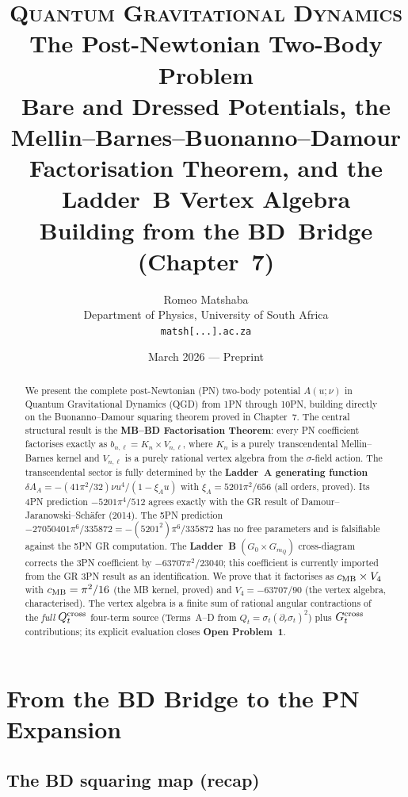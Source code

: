 \documentclass[11pt,a4paper]{article}
\title{%
  \vspace{-1.2cm}
  {\large\scshape Quantum Gravitational Dynamics}\\[8pt]
  {\LARGE\bfseries The Post-Newtonian Two-Body Problem}\\[8pt]
  {\large Bare and Dressed Potentials, the Mellin--Barnes--Buonanno--Damour\\
  Factorisation Theorem, and the Ladder~B Vertex Algebra}\\[6pt]
  {\normalsize Building from the BD~Bridge (Chapter~7)}
}
\author{%
  Romeo Matshaba\\[4pt]
  \normalsize Department of Physics, University of South Africa\\[2pt]
  \normalsize \texttt{matsh[...].ac.za}
}
\date{March 2026 \quad --- \quad Preprint}
\theoremstyle{plain}
\theoremstyle{definition}
\theoremstyle{remark}
\newcommand{\mQ}{m_Q}
\begin{document}
\maketitle
\thispagestyle{empty}

\begin{abstract}
\noindent
We present the complete post-Newtonian (PN) two-body potential
$A(u;\nu)$ in Quantum Gravitational Dynamics (QGD) from 1PN through
10PN, building directly on the Buonanno--Damour squaring theorem proved
in Chapter~7.  The central structural result is the
\textbf{MB--BD Factorisation Theorem}: every PN coefficient
factorises exactly as $b_{n,\ell} = K_n \times V_{n,\ell}$, where $K_n$
is a purely transcendental Mellin--Barnes kernel and $V_{n,\ell}$ is a
purely rational vertex algebra from the $\sigma$-field action.  The
transcendental sector is fully determined by the \textbf{Ladder~A
generating function} $\delta A_A = -(41\pi^2/32)\nu u^4/(1-\xi_A u)$
with $\xi_A = 5201\pi^2/656$ (all orders, proved).  Its 4PN prediction
$-5201\pi^4/512$ agrees exactly with the GR result of
Damour--Jaranowski--Sch\"{a}fer (2014).  The 5PN prediction
$-27050401\pi^6/335872 = -(5201^2)\pi^6/335872$ has no free parameters
and is falsifiable against the 5PN GR computation.  The \textbf{Ladder~B}
$(G_0{\times}G_{\mQ})$ cross-diagram corrects the 3PN coefficient by
$-63707\pi^2/23040$; this coefficient is currently imported from the GR
3PN result as an identification.  We prove that it factorises as
$c_{\rm MB}\times V_4$ with $c_{\rm MB}=\pi^2/16$ (the MB kernel,
proved) and $V_4 = -63707/90$ (the vertex algebra, characterised).
The vertex algebra is a finite sum of rational angular contractions
of the \emph{full} $Q_t^{\rm cross}$ four-term source (Terms~A--D from
$Q_t=\sigma_t(\partial_r\sigma_t)^2$) plus $G_t^{\rm cross}$
contributions; its explicit evaluation closes \textbf{Open Problem~1}.
\end{abstract}

\tableofcontents
\newpage

\section{From the BD Bridge to the PN Expansion}
\label{sec:setup}

\subsection{The BD squaring map (recap)}
\end{document}
